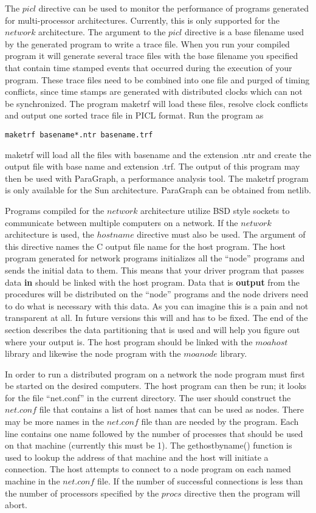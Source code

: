 The $picl$ directive can be used to monitor the performance of programs
generated for multi-processor architectures.  Currently, this is only supported
for the $network$ architecture.  The argument to the $picl$ directive is 
a base filename used by the generated program to write a trace file.  When
you run your compiled program it will generate several trace files with
the base filename you specified that contain time stamped events that occurred
during the execution of your program.  These trace files need to be combined
into one file and purged of timing conflicts, since time stamps are generated
with distributed clocks which can not be synchronized.  The program maketrf
will load these files, resolve clock conflicts and output one sorted trace file
in PICL format.  Run the program as
\begin{verbatim}
maketrf basename*.ntr basename.trf
\end{verbatim}
maketrf will load all the files with basename and the extension .ntr and create
the output file with base name and extension .trf.  The output of this program
may then be used with ParaGraph, a performance analysis tool.  The maketrf
program is only available for the Sun architecture.  ParaGraph can be obtained
from netlib.

Programs compiled for the $network$ architecture utilize BSD style sockets to 
communicate between multiple computers on a network.  If the $network$ 
architecture is used, the $hostname$ directive must also be used.  The argument
of this directive
names the C output file name for the host program.  The host program
generated for network programs initializes all the ``node'' programs and
sends the initial data to them.  This means that your driver program that
passes data {\bf in} should be linked with the host program.  Data that
is {\bf output} from the procedures will be distributed on the ``node'' 
programs and the node drivers need to do what is necessary with this data.
As you can imagine this is a pain and not transparent at all.  In future 
versions this will and has to be fixed.  The end of the section describes the
data partitioning that is used and will help you figure out where your 
output is.  The host program should be linked with the $moahost$ library
and likewise the node program with the $moanode$ library.

In order to run a distributed program on a network the node
program must first be started on the desired computers.  The host program
can then be run; it looks for the file ``net.conf'' in the current directory.
The user should construct the $net.conf$ file that contains a list of host 
names that can be used as nodes.  There may be more names in the $net.conf$ 
file than are needed by the program.
Each line contains one name followed by the number of processes
that should be used on that machine (currently this must be 1).  The 
gethostbyname() function is used to lookup the address of that machine and
the host will initiate a connection.  The host attempts to connect to a node
program on each named machine in the $net.conf$ file.  If the number of 
successful connections is less than the number of processors specified by the
$procs$ directive then the program will abort.

